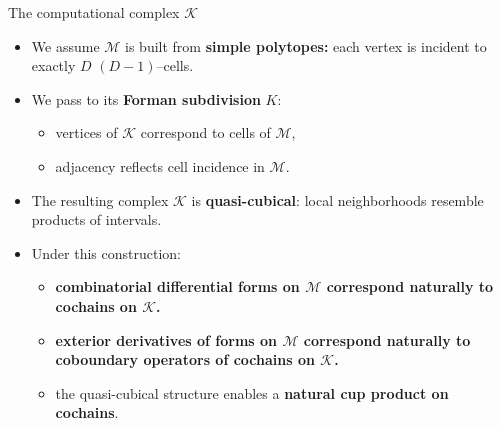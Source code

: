 \begin{frame}{The computational complex $\mathcal{K}$
\href{https://www.worldscientific.com/doi/abs/10.1142/S0129167X02001265}{}
}

\begin{itemize}

\item We assume $\mathcal{M}$ is built from \textbf{simple polytopes:} each vertex is incident to exactly $D$ $(D\!-\!1)$–cells.
\vspace{0.2cm}

\item We pass to its \textbf{Forman subdivision} $K$:
\begin{itemize}
\item vertices of $\mathcal{K}$ correspond to cells of $\mathcal{M}$,
\item adjacency reflects cell incidence in $\mathcal{M}$.
\end{itemize}
\vspace{0.2cm}

\item The resulting complex $\mathcal{K}$ is \textbf{quasi-cubical}: local neighborhoods resemble products of intervals.
\vspace{0.2cm}

\item Under this construction:
\begin{itemize}
    \item \textbf{combinatorial differential forms on $\mathcal{M}$ correspond naturally to cochains on $\mathcal{K}$.}
    \item \textbf{exterior derivatives of forms on $\mathcal{M}$ correspond naturally to coboundary operators of cochains on $\mathcal{K}$.}
    \item the quasi-cubical structure enables a \textbf{natural cup product on cochains}.
\end{itemize}
\vspace{0.2cm}

\end{itemize}
\end{frame}


